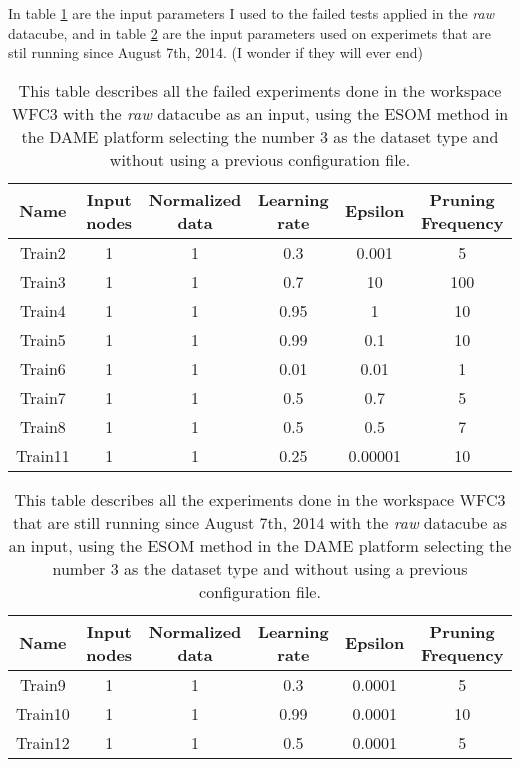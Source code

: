 \documentclass[11pt,fleqn]{book} %
\begin{document}
In table \ref{tab:ds9failed} are the input parameters I used to the failed tests applied in the \emph{raw} datacube, and in table \ref{tab:ds9running} are the input parameters used on experimets that are stil running since August 7th, 2014. (I wonder if they will ever end)

\begin{table}[h!]
  \centering
    \begin{tabular}{ c c c c c c }
    \hline\hline
    
    Name & Input nodes & Normalized data & Learning rate & Epsilon & Pruning Frequency\\
    \hline
    
    Train2 & 1 & 1 & 0.3 & 0.001 & 5\\
    Train3 & 1 & 1 & 0.7 & 10 & 100\\
    Train4 & 1 & 1 & 0.95 & 1 & 10\\
    Train5 & 1 & 1 & 0.99 & 0.1 & 10\\
    Train6 & 1 & 1 & 0.01 & 0.01 & 1\\
    Train7 & 1 & 1 & 0.5 & 0.7 & 5\\
    Train8 & 1 & 1 & 0.5 & 0.5 & 7\\
    Train11 & 1 & 1 & 0.25 & 0.00001 & 10\\
    
    \hline
  \end{tabular}
  \caption{This table describes all the failed experiments done in the workspace WFC3 with the \emph{raw} datacube as an input, using the ESOM method in the DAME platform selecting the number 3 as the dataset type and without using a previous configuration file.}
  \label{tab:ds9failed}
\end{table}

\begin{table}[h!]
  \centering
    \begin{tabular}{ c c c c c c }
    \hline\hline
    
    Name & Input nodes & Normalized data & Learning rate & Epsilon & Pruning Frequency\\
    \hline
    
    Train9 & 1 & 1 & 0.3 & 0.0001 & 5\\
    Train10 & 1 & 1 & 0.99 & 0.0001 & 10\\
    Train12 & 1 & 1 & 0.5 & 0.0001 & 5\\
    
    \hline
  \end{tabular}
  \caption{This table describes all the experiments done in the workspace WFC3 that are still running since August 7th, 2014 with the \emph{raw} datacube as an input, using the ESOM method in the DAME platform selecting the number 3 as the dataset type and without using a previous configuration file.}
  \label{tab:ds9running}
\end{table}
\end{document}

